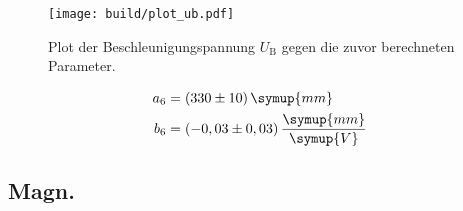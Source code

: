 \begin{figure}
  \centering
  \texttt{[image: build/plot\_ub.pdf]}
  \caption{Plot der Beschleunigungspannung $U_\text{B}$ gegen die zuvor berechneten Parameter.}
  \label{fig:plt-ub}
\end{figure}

\begin{align*}
  a_6 &= (330 \pm 10) \, \symup{mm} \\
  b_6 &= (-0,03 \pm 0,03) \, \frac{\symup{mm}}{\symup{V}}
\end{align*}



\subsection{Magn.}

